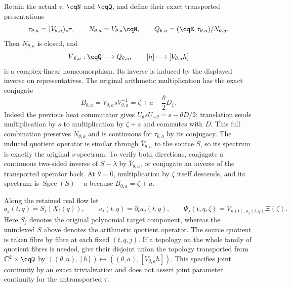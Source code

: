 Retain the actual $\tau$, $\cqN$ and $\cqQ$, and define their exact
transported presentations
\begin{equation}
 \tau_{\theta,a}=(V_{\theta,a})_*\tau,\qquad
 N_{\theta,a}=V_{\theta,a}\cqN,\qquad
 Q_{\theta,a}=(\cqE,\tau_{\theta,a})/N_{\theta,a}.
 \label{eq:cq-flow-moving-source}
\end{equation}
Then $N_{\theta,a}$ is closed, and
\[
 \overline V_{\theta,a}:\cqQ\longrightarrow Q_{\theta,a},
 \qquad[h]\longmapsto[V_{\theta,a}h]
\]
is a complex-linear homeomorphism. Its inverse is induced by the
displayed inverse on representatives. The original arithmetic
multiplication has the exact conjugate
\begin{equation}
 B_{\theta,a}=V_{\theta,a}sV_{\theta,a}^{-1}
              =\zeta+a-\frac{\theta}{2}D_\zeta .
 \label{eq:cq-flow-spectral-generator}
\end{equation}
Indeed the previous heat commutator gives
$U_\theta sU_{-\theta}=s-\theta D/2$; translation sends multiplication
by $s$ to multiplication by $\zeta+a$ and commutes with $D$.
This full combination preserves $N_{\theta,a}$ and is continuous for
$\tau_{\theta,a}$ by its conjugacy. The induced quotient operator is
similar through $\overline V_{\theta,a}$ to the source $S$, so its
spectrum is exactly the original $s$-spectrum. To verify both
directions, conjugate a continuous two-sided inverse of $S-\lambda$
by $\overline V_{\theta,a}$, or conjugate an inverse of the transported
operator back. At $\theta=0$, multiplication by $\zeta$ itself
descends, and its spectrum is $\operatorname{Spec}(S)-a$ because
$B_{0,a}=\zeta+a$.

Along the retained real flow let
\[
 a_j(t,q)=S_j(X_t(q)),\qquad
 v_j(t,q)=\partial_ta_j(t,q),\qquad
 \Psi_j(t,q,\zeta)=V_{\vartheta(t),a_j(t,q)}\Xi(\zeta).
\]
Here $S_j$ denotes the original polynomial target component, whereas
the unindexed $S$ above denotes the arithmetic quotient operator.
The source quotient is taken fibre by fibre at each fixed $(t,q,j)$.
If a topology on the whole family of quotient fibres is needed, give
their disjoint union the topology transported from
$\mathbb C^2\times\cqQ$ by
$((\theta,a),[h])\mapsto((\theta,a),[V_{\theta,a}h])$.
This specifies joint continuity by an exact trivialization and does
not assert joint parameter continuity for the untransported $\tau$.

